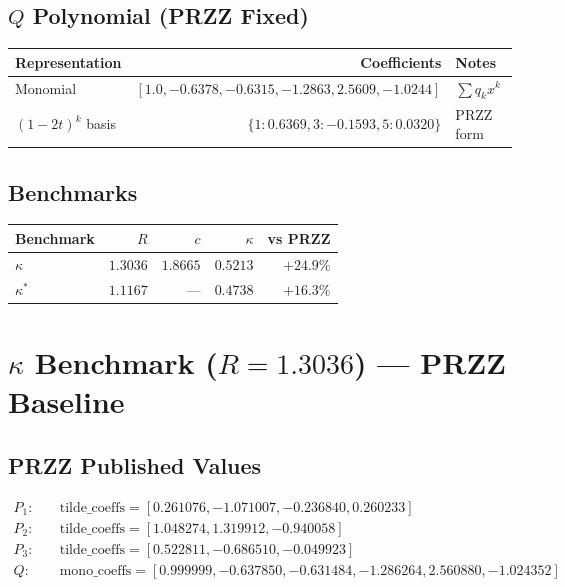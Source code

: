 \documentclass[11pt]{article}
\begin{document}
\subsection{$Q$ Polynomial (PRZZ Fixed)}

\begin{center}
\begin{tabular}{lrl}
\toprule
Representation & Coefficients & Notes \\
\midrule
Monomial & $[1.0, -0.6378, -0.6315, -1.2863, 2.5609, -1.0244]$ & $\sum q_k x^k$ \\
$(1-2t)^k$ basis & $\{1: 0.6369, 3: -0.1593, 5: 0.0320\}$ & PRZZ form \\
\bottomrule
\end{tabular}
\end{center}

\subsection{Benchmarks}

\begin{center}
\begin{tabular}{lrrrr}
\toprule
Benchmark & $R$ & $c$ & $\kappa$ & vs PRZZ \\
\midrule
$\kappa$ & $1.3036$ & $1.8665$ & $\mathbf{0.5213}$ & $\mathbf{+24.9\%}$ \\
$\kappa^*$ & $1.1167$ & --- & $\mathbf{0.4738}$ & $\mathbf{+16.3\%}$ \\
\bottomrule
\end{tabular}
\end{center}

\section{$\kappa$ Benchmark ($R = 1.3036$) --- PRZZ Baseline}

\subsection{PRZZ Published Values}

\begin{align*}
P_1: \quad & \text{tilde\_coeffs} = [0.261076, -1.071007, -0.236840, 0.260233] \\
P_2: \quad & \text{tilde\_coeffs} = [1.048274, 1.319912, -0.940058] \\
P_3: \quad & \text{tilde\_coeffs} = [0.522811, -0.686510, -0.049923] \\
Q: \quad & \text{mono\_coeffs} = [0.999999, -0.637850, -0.631484, -1.286264, 2.560880, -1.024352]
\end{align*}
\end{document}
